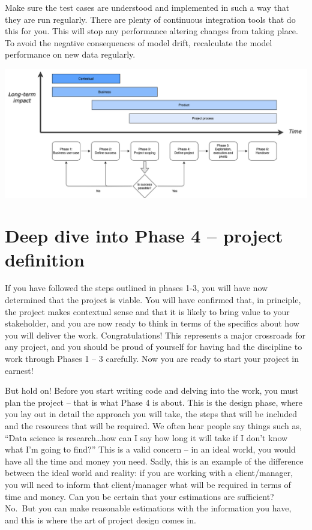 \documentclass[
]{book}
\begin{document}
Make sure the test cases are understood and implemented in such a way that they are run regularly. There are plenty of continuous integration tools that do this for you. This will stop any performance altering changes from taking place. To avoid the negative consequences of model drift, recalculate the model performance on new data regularly.

\includegraphics[width=1\linewidth]{figures/Framework phases}

\hypertarget{deep-dive-into-phase-4-project-definition}{%
\chapter{Deep dive into Phase 4 -- project definition}\label{deep-dive-into-phase-4-project-definition}}

If you have followed the steps outlined in phases 1-3, you will have now determined that the project is viable. You will have confirmed that, in principle, the project makes contextual sense and that it is likely to bring value to your stakeholder, and you are now ready to think in terms of the specifics about how you will deliver the work. Congratulations! This represents a major crossroads for any project, and you should be proud of yourself for having had the discipline to work through Phases 1 -- 3 carefully. Now you are ready to start your project in earnest!

But hold on! Before you start writing code and delving into the work, you must plan the project -- that is what Phase 4 is about. This is the design phase, where you lay out in detail the approach you will take, the steps that will be included and the resources that will be required. We often hear people say things such as, ``Data science is research\ldots how can I say how long it will take if I don't know what I'm going to find?'' This is a valid concern -- in an ideal world, you would have all the time and money you need. Sadly, this is an example of the difference between the ideal world and reality: if you are working with a client/manager, you will need to inform that client/manager what will be required in terms of time and money. Can you be certain that your estimations are sufficient? No.~But you can make reasonable estimations with the information you have, and this is where the art of project design comes in.
\end{document}
